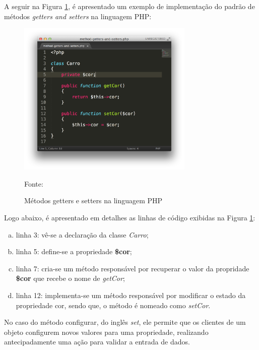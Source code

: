 A seguir na Figura \ref{fig:methodGettersAndSetters}, é apresentado um exemplo
de implementação do padrão de métodos \textit{getters and setters} na
linguagem \acs{PHP}:

\begin{figure}[h!tb]
	\caption{Métodos getters e setters na linguagem PHP}
	\label{fig:methodGettersAndSetters}

	\centering
	\includegraphics[width=0.75\textwidth]{images/method-getters-and-setters.png}

	\centering
	\footnotesize Fonte: \fonteOAutor
\end{figure}

\FloatBarrier 	%

Logo abaixo, é apresentado em detalhes as linhas de código exibidas na Figura 
\ref{fig:methodGettersAndSetters}:

\begin{enumerate}[a)]
    \item linha 3: vê-se a declaração da classe \textit{Carro};
    \item linha 5: define-se a propriedade \textbf{\$cor};
    \item linha 7: cria-se um método responsável por recuperar o valor da
    propridade \textbf{\$cor} que recebe o nome de \textit{getCor};
    \item linha 12: implementa-se um método responsável por modificar o estado
    da propriedade cor, sendo que, o método é nomeado como \textit{setCor}.
\end{enumerate}

No caso do método configurar, do inglês \textit{set}, ele permite que os
clientes de um objeto configurem novos valores para uma propriedade, realizando
antecipadamente uma ação para validar a entrada de dados.

